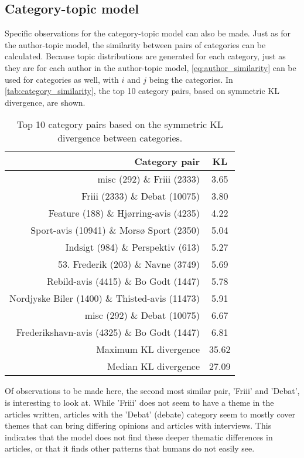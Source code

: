 \subsection{Category-topic model}\label{sec:discussion_category_topic}
Specific observations for the category-topic model can also be made.
Just as for the author-topic model, the similarity between pairs of categories can be calculated.
Because topic distributions are generated for each category, just as they are for each author in the author-topic model, \autoref{eq:author_similarity} can be used for categories as well, with $i$ and $j$ being the categories.
In \autoref{tab:category_similarity}, the top 10 category pairs, based on symmetric KL divergence, are shown.

\begin{table}[h]
	\centering
	\caption{Top 10 category pairs based on the symmetric KL divergence between categories.}
	\begin{tabular}{r|c}
		Category pair & KL \\
		\midrule
		misc (292) \& Friii (2333) & 3.65 \\
		Friii (2333) \& Debat (10075) & 3.80 \\
		Feature (188) \& Hjørring-avis (4235) & 4.22 \\
		Sport-avis (10941) \& Morsø Sport (2350) & 5.04 \\
		Indsigt (984) \& Perspektiv (613) & 5.27 \\
		53. Frederik (203) \& Navne (3749) & 5.69 \\
		Rebild-avis (4415) \& Bo Godt (1447) & 5.78 \\
		Nordjyske Biler (1400) \& Thisted-avis (11473) & 5.91 \\
		misc (292) \& Debat (10075) & 6.67 \\
		Frederikshavn-avis (4325) \& Bo Godt (1447) & 6.81 \\
		\midrule
		Maximum KL divergence & 35.62 \\
		Median KL divergence & 27.09 \\
	\end{tabular}
	\label{tab:category_similarity}
\end{table}

Of observations to be made here, the second most similar pair, 'Friii' and 'Debat', is interesting to look at.
While 'Friii' does not seem to have a theme in the articles written, articles with the 'Debat' (debate) category seem to mostly cover themes that can bring differing opinions and articles with interviews.
This indicates that the model does not find these deeper thematic differences in articles, or that it finds other patterns that humans do not easily see.

